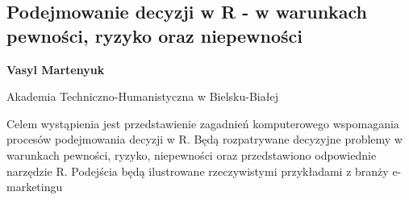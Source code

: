 \documentclass[\main/boa.tex]{subfiles}
\begin{document}
\subsection{Podejmowanie decyzji w R - w warunkach pewności, ryzyko oraz niepewności}

\begin{minipage}{0.915\textwidth}
	\centering
  {\bf {} Vasyl Martenyuk }
\end{minipage}

\vskip 0.3cm

\begin{affiliations}
\begin{minipage}{0.915\textwidth}
\centering
Akademia Techniczno-Humanistyczna w Bielsku-Białej \\[-2pt]
\end{minipage}
\end{affiliations}

\vskip 0.8cm

Celem wystąpienia jest przedstawienie zagadnień komputerowego wspomagania procesów podejmowania decyzji w R. Będą rozpatrywane decyzyjne problemy w warunkach pewności, ryzyko, niepewności oraz przedstawiono odpowiednie narzędzie R. Podejścia będą ilustrowane rzeczywistymi przykładami z branży e-marketingu
\end{document}
